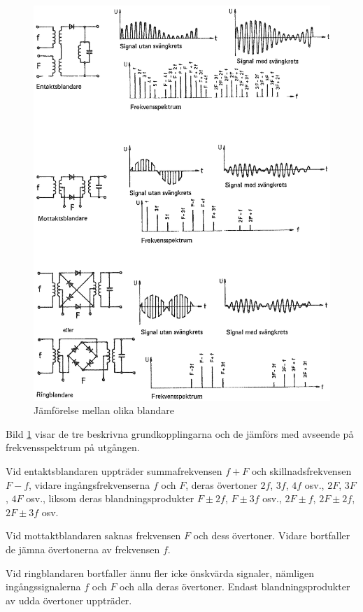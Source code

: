 \begin{figure}
\includegraphics[width=\textwidth]{images/cropped_pdfs/bild_2_3-87.pdf}
\caption{Jämförelse mellan olika blandare}
\label{fig:BildII3-87}
\end{figure}

Bild \ref{fig:BildII3-87} visar de tre beskrivna grundkopplingarna och de
jämförs med avseende på frekvensspektrum på utgången.

Vid entaktsblandaren uppträder summafrekvensen \(f + F\) och
skillnadsfrekvensen \(F - f\), vidare ingångsfrekvenserna \(f\) och \(F\),
deras övertoner \(2f\), \(3f\), \(4f\) osv., \(2F\), \(3F\),
\(4F\) osv., liksom deras blandningsprodukter \(F\pm 2f\), \(F\pm
3f\) osv., \(2F \pm f\), \(2F \pm 2f\), \(2F \pm 3f\) osv.

Vid mottaktblandaren saknas frekvensen \(F\) och dess övertoner.
Vidare bortfaller de jämna övertonerna av frekvensen \(f\).

Vid ringblandaren bortfaller ännu fler icke önskvärda signaler,
nämligen ingångssignalerna \(f\) och \(F\) och alla deras övertoner.
Endast blandningsprodukter av udda övertoner uppträder.

